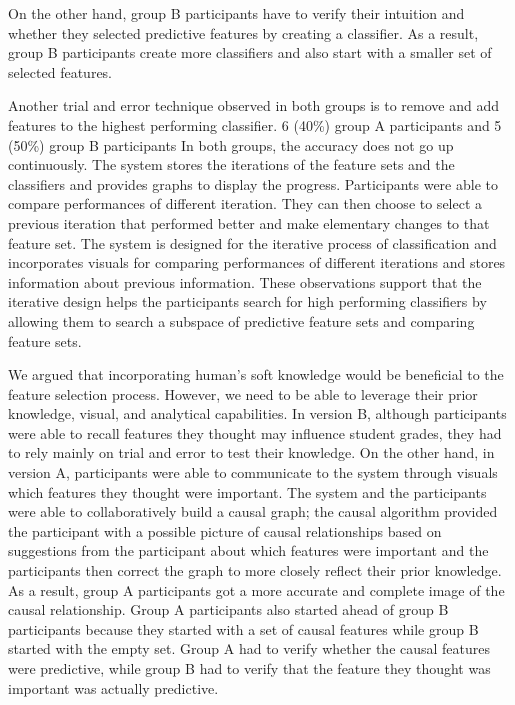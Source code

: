 On the other hand, group B participants have to verify their intuition and whether they selected predictive features by creating a classifier. As a result, group B participants create more classifiers and also start with a smaller set of selected features.

Another trial and error technique observed in both groups is to remove and add features to the highest performing classifier. 6 (40\%) group A participants and 5 (50\%) group B participants In both groups, the accuracy does not go up continuously. The system stores the iterations of the feature sets and the classifiers and provides graphs to display the progress. Participants were able to compare performances of different iteration. They can then choose to select a previous iteration that performed better and make elementary changes to that feature set. The system is designed for the iterative process of classification and incorporates visuals for comparing performances of different iterations and stores information about previous information. These observations support that the iterative design helps the participants search for high performing classifiers by allowing them to search a subspace of predictive feature sets and comparing feature sets.

We argued that incorporating human’s soft knowledge would be beneficial to the feature selection process. However, we need to be able to leverage their prior knowledge, visual, and analytical capabilities. In version B, although participants were able to recall features they thought may influence student grades, they had to rely mainly on trial and error to test their knowledge. On the other hand, in version A, participants were able to communicate to the system through visuals which features they thought were important. The system and the participants were able to collaboratively build a causal graph; the causal algorithm provided the participant with a possible picture of causal relationships based on suggestions from the participant about which features were important and the participants then correct the graph to more closely reflect their prior knowledge. As a result, group A participants got a more accurate and complete image of the causal relationship. Group A participants also started ahead of group B participants because they started with a set of causal features while group B started with the empty set. Group A had to verify whether the causal features were predictive, while group B had to verify that the feature they thought was important was actually predictive.

